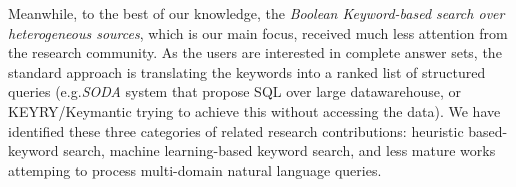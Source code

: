 Meanwhile, to the best of our knowledge, the \textit{Boolean Keyword-based search over heterogeneous sources}, which is our main focus, received much less attention from the research community. 
%
{\color{magenta}As the users are interested in complete answer sets, the standard approach is translating the keywords into a ranked list of structured queries (e.g.\textit{SODA} system that propose SQL over large datawarehouse, or KEYRY/Keymantic trying to achieve this without accessing the data).}
%
We have identified these three categories of related research contributions: heuristic based-keyword search, machine learning-based keyword search, and {\color{magenta}less mature works} attemping to process multi-domain natural language queries.
%
